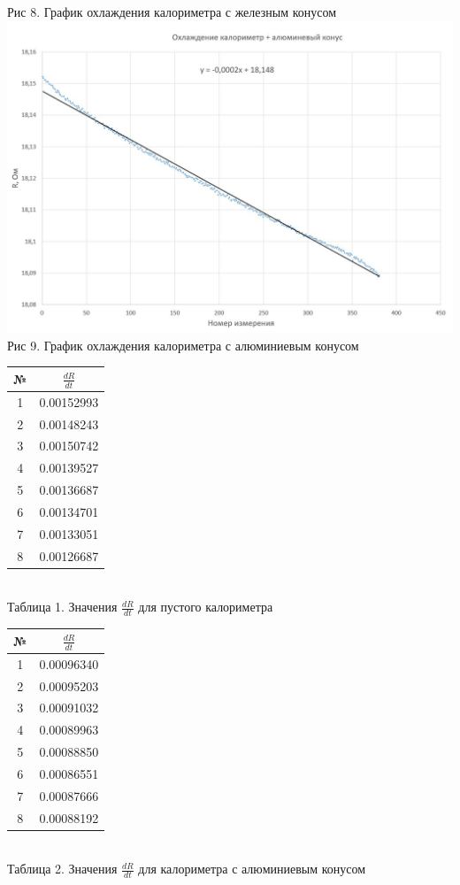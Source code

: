 \documentclass[a4paper, 12pt]{article}
\begin{document}
\begin{center}
		Рис 8. График охлаждения калориметра с железным конусом
		\includegraphics[width=15cm]{"Охлаждение алюм.jpg"}\\
		Рис 9. График охлаждения калориметра с алюминиевым конусом
 	\end{center}
 
 
\begin{center}
 	\begin{tabular} {|c | c |}
		№ & $\frac{dR}{dt}$ \\
		\hline
		1 & 0.00152993 \\
		\hline
		2 & 0.00148243 \\
		\hline
		3 & 0.00150742 \\
		\hline
		4 & 0.00139527 \\
		\hline
		5 & 0.00136687 \\
		\hline
		6 & 0.00134701 \\
		\hline
		7 & 0.00133051 \\
		\hline
		8 & 0.00126687 \\
		\hline
 	\end{tabular}\\
 	Таблица 1. Значения $\frac{dR}{dt}$ для пустого калориметра
 \end{center}

\begin{center}
	\begin{tabular} {|c | c |}
		\hline	
		№ & $\frac{dR}{dt}$ \\
		\hline
		1 & 0.00096340 \\
		\hline
		2 & 0.00095203 \\
		\hline
		3 & 0.00091032 \\
		\hline
		4 & 0.00089963 \\
		\hline
		5 & 0.00088850 \\
		\hline
		6 & 0.00086551 \\
		\hline
		7 & 0.00087666 \\
		\hline
		8 & 0.00088192 \\
		\hline
	\end{tabular}\\
	Таблица 2. Значения $\frac{dR}{dt}$ для калориметра с алюминиевым конусом
\end{center}
\end{document}
